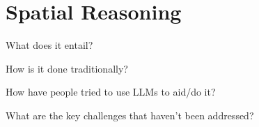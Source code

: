 \section{Spatial Reasoning}
\label{section:background}

What does it entail?


How is it done traditionally?


How have people tried to use LLMs to aid/do it?


What are the key challenges that haven't been addressed?